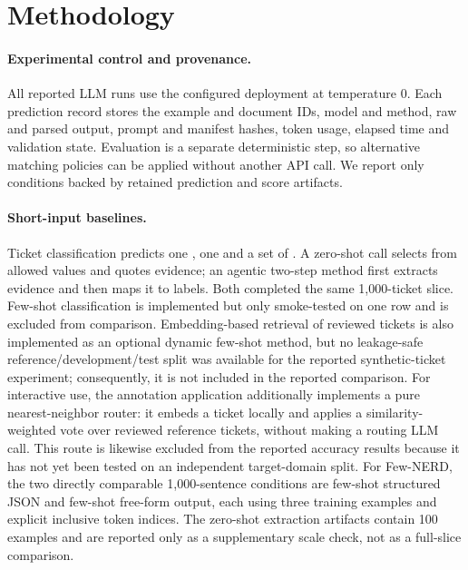 \section{Methodology}
\label{sec:methodology}

\paragraph{Experimental control and provenance.}
All reported LLM runs use the configured  deployment at
temperature $0$. Each prediction record stores the example and document IDs,
model and method, raw and parsed output, prompt and manifest hashes, token
usage, elapsed time and validation state. Evaluation is a separate deterministic
step, so alternative matching policies can be applied without another API call.
We report only conditions backed by retained prediction and score artifacts.

\paragraph{Short-input baselines.}
Ticket classification predicts one , one  and
a set of . A zero-shot call selects from allowed values and
quotes evidence; an agentic two-step method first extracts evidence and then
maps it to labels. Both completed the same 1{,}000-ticket slice. Few-shot
classification is implemented but only smoke-tested on one row and is excluded
from comparison. Embedding-based retrieval of reviewed tickets is also
implemented as an optional dynamic few-shot method, but no leakage-safe
reference/development/test split was available for the reported synthetic-ticket
experiment; consequently, it is not included in the reported comparison. For
interactive use, the annotation application additionally implements a pure
nearest-neighbor router: it embeds a ticket locally and applies a
similarity-weighted vote over reviewed reference tickets, without making a
routing LLM call. This route is likewise excluded from the reported accuracy
results because it has not yet been tested on an independent target-domain
split. For Few-NERD, the two directly comparable 1{,}000-sentence
conditions are few-shot structured JSON and few-shot free-form output, each
using three training examples and explicit inclusive token indices. The
zero-shot extraction artifacts contain 100 examples and are reported only as a
supplementary scale check, not as a full-slice comparison.

